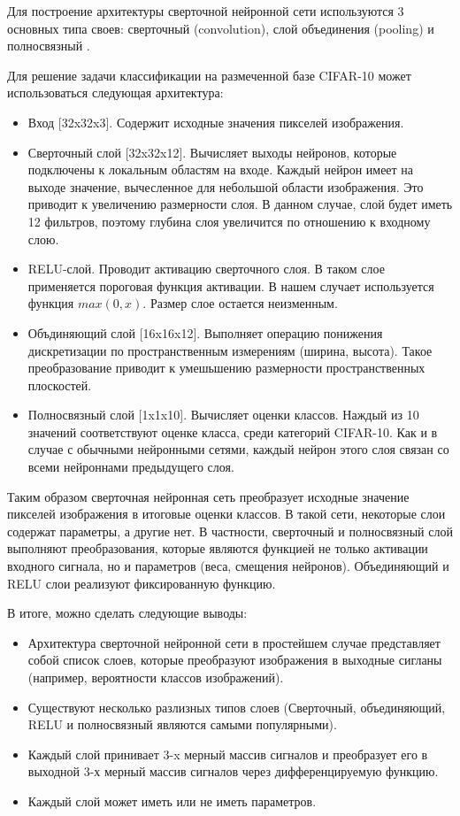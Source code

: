 \documentclass[a4paper,english,russian]{G2-105}
\begin{document}
\par Для построение архитектуры сверточной нейронной сети используются 3 основных типа своев: сверточный (convolution), слой объединения (pooling) и полносвязный \cite{15}. 
\par Для решение задачи классификации на размеченной базе CIFAR-10 может использоваться следующая архитектура:
\begin{itemize}
\item Вход [32x32x3]. Содержит исходные значения пикселей изображения.
\item Сверточный слой [32x32x12]. Вычисляет выходы нейронов, которые подключены к локальным областям на входе. Каждый нейрон имеет на выходе значение, вычесленное для небольшой области изображения. Это приводит к увеличению размерности слоя. В данном случае, слой будет иметь 12 фильтров, поэтому глубина слоя увеличится по отношению к входному слою.
\item RELU-слой. Проводит активацию сверточного слоя. В таком слое применяется пороговая функция активации. В нашем случает используется функция $max(0, x)$. Размер слое остается неизменным.
\item Объдиняющий слой [16x16x12]. Выполняет операцию понижения дискретизации по пространственным измерениям (ширина, высота). Такое преобразование приводит к умешьшению размерности пространственных плоскостей.
\item Полносвязный слой [1x1x10]. Вычисляет оценки классов. Наждый из 10 значений соответствуют оценке класса, среди категорий CIFAR-10. Как и в случае с обычными нейронными сетями, каждый нейрон этого слоя связан со всеми нейроннами предыдущего слоя.
\end{itemize}
\par Таким образом сверточная нейронная сеть преобразует исходные значение пикселей изображения в итоговые оценки классов. В такой сети, некоторые слои содержат параметры, а другие нет. В частности, сверточный и полносвязный слой выполняют преобразования, которые являются функцией не только активации входного сигнала, но и параметров (веса, смещения нейронов). Объединяющий и RELU слои реализуют фиксированную функцию. 
\par В итоге, можно сделать следующие выводы:
\begin{itemize}
\item Архитектура сверточной нейронной сети в простейшем случае представляет собой список слоев, которые преобразуют изображения в выходные сигланы (например, вероятности классов изображений).
\item Существуют несколько разлизных типов слоев (Сверточный, объединяющий, RELU и полносвязный являются самыми популярными).
\item Каждый слой принивает 3-x мерный массив сигналов и преобразует его в выходной 3-х мерный массив сигналов через дифференцируемую функцию.
\item Каждый слой может иметь или не иметь параметров.
\end{itemize}
\end{document}
